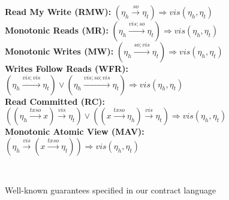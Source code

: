 \begin{figure}[h]
	\centering
	\begin{minipage}{.88\textwidth}
		{\bf Read My Write (RMW): } \hspace {12 mm}
		$ (\eta_h \xrightarrow{so} \eta_t) \Rightarrow vis (\eta_h,\eta_t) $ \\
		
		{\bf Monotonic Reads (MR): } \hspace {12 mm}
		$ (\eta_h \xrightarrow{vis;so} \eta_t) \Rightarrow vis (\eta_h,\eta_t) $ \\
		
		{\bf Monotonic Writes (MW): } 	\hspace {10 mm}
		$ (\eta_h \xrightarrow{so;vis} \eta_t) \Rightarrow vis (\eta_h,\eta_t) $ \\
		
		{\bf Writes Follow Reads (WFR): } \hspace {5 mm} 	
		$ (\eta_h \xrightarrow{vis;vis} \eta_t) \vee  (\eta_h \xrightarrow{vis;so;vis} \eta_t)  \Rightarrow vis (\eta_h,\eta_t)  $ \\
		
		{\bf Read Committed (RC): } \hspace {14 mm} 		
		$  ((\eta_h \xrightarrow{txso} x)\xrightarrow{vis} \eta_t) \vee 
		((x \xrightarrow{txso} \eta_h)\xrightarrow{vis} \eta_t)  \Rightarrow vis (\eta_h,\eta_t) $ \\
		
		{\bf Monotonic Atomic View (MAV): } 	
		$ (\eta_h \xrightarrow{vis} (x \xrightarrow{txso}  \eta_t))  \Rightarrow vis (\eta_h,\eta_t) $ \\

	\end{minipage}
	\\
	\hrulefill
	\caption{Well-known guarantees specified in our contract language}
\end{figure}
